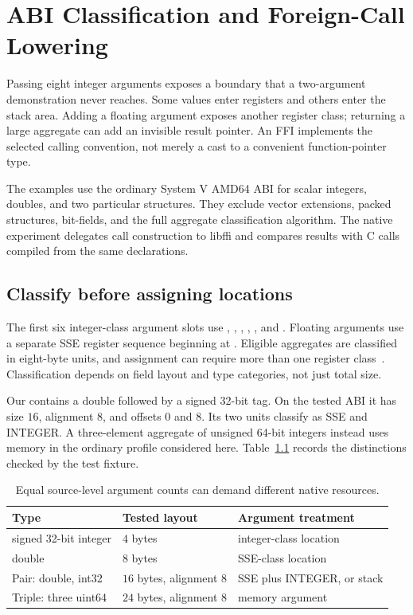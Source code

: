 \chapter{ABI Classification and Foreign-Call Lowering}
\label{ch:ffi-abi}

Passing eight integer arguments exposes a boundary that a two-argument demonstration never reaches.
Some values enter registers and others enter the stack area.
Adding a floating argument exposes another register class; returning a large aggregate can add an invisible result pointer.
An FFI implements the selected calling convention, not merely a cast to a convenient function-pointer type.

The examples use the ordinary System V AMD64 ABI for scalar integers, doubles, and two particular structures.
They exclude vector extensions, packed structures, bit-fields, and the full aggregate classification algorithm.
The native experiment delegates call construction to libffi and compares results with C calls compiled from the same declarations.

\section{Classify before assigning locations}
\label{sec:ch70-classify}
The first six integer-class argument slots use , , , , , and .
Floating arguments use a separate SSE register sequence beginning at .
Eligible aggregates are classified in eight-byte units, and assignment can require more than one register class~\cite{matz-2012-amd64}.
Classification depends on field layout and type categories, not just total size.

Our  contains a double followed by a signed 32-bit tag.
On the tested ABI it has size $16$, alignment $8$, and offsets $0$ and $8$.
Its two units classify as SSE and INTEGER.
A three-element aggregate of unsigned 64-bit integers instead uses memory in the ordinary profile considered here.
Table~\ref{tab:ch70-types} records the distinctions checked by the test fixture.

\begin{table}[htbp]
\caption{Equal source-level argument counts can demand different native resources.}
\label{tab:ch70-types}
\centering
\begin{tabular}{lll}
\toprule
Type & Tested layout & Argument treatment \\
\midrule
signed 32-bit integer & $4$ bytes & integer-class location \\
double & $8$ bytes & SSE-class location \\
Pair: double, int32 & $16$ bytes, alignment $8$ & SSE plus INTEGER, or stack \\
Triple: three uint64 & $24$ bytes, alignment $8$ & memory argument \\
\bottomrule
\end{tabular}
\end{table}


